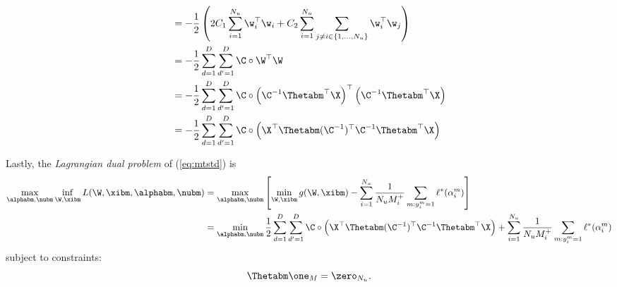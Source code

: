 \begin{equation*}
\begin{aligned}
&= - \frac{1}{2} \left( 2C_1 \sum_{i=1}^{N_u} \w_i^\top \w_i + C_2 \sum_{i=1}^{N_u} \sum_{j \ne i \in \{1,\dots,N_u\}} \w_i^\top \w_j \right) \\
&= - \frac{1}{2} \sum_{d=1}^{D} \sum_{d'=1}^{D} \C \circ \W^\top \W \\
&= - \frac{1}{2} \sum_{d=1}^{D} \sum_{d'=1}^{D} \C \circ \left( \C^{-1} \Thetabm^\top \X \right)^\top  \left( \C^{-1} \Thetabm^\top \X \right) \\
&= - \frac{1}{2} \sum_{d=1}^{D} \sum_{d'=1}^{D} \C \circ \left( \X^\top \Thetabm (\C^{-1})^\top \C^{-1} \Thetabm^\top \X \right) \\
\end{aligned}
\end{equation*}

Lastly, the \emph{Lagrangian dual problem} of (\ref{eq:mtstd}) is
\begin{equation}
\label{eq:mtdual}
\begin{aligned}
\max_{\alphabm, \nubm} \inf_{\W, \xibm} L(\W, \xibm, \alphabm, \nubm) 
&= \max_{\alphabm, \nubm} \left[ \min_{\W, \xibm} g(\W, \xibm)
   - \sum_{i = 1}^{N_u} \frac{1}{N_u M_i^+} \sum_{m: y_i^m = 1} \ell^*(\alpha_i^m) \right] \\
&= \min_{\alphabm, \nubm} \frac{1}{2} \sum_{d=1}^{D} \sum_{d'=1}^{D} \C \circ \left( \X^\top \Thetabm (\C^{-1})^\top \C^{-1} \Thetabm^\top \X \right) 
   + \sum_{i = 1}^{N_u} \frac{1}{N_u M_i^+} \sum_{m: y_i^m = 1} \ell^*(\alpha_i^m) \\
\end{aligned}
\end{equation}
subject to constraints:
\begin{equation*}
\Thetabm \one_M = \zero_{N_u}.
\end{equation*}
